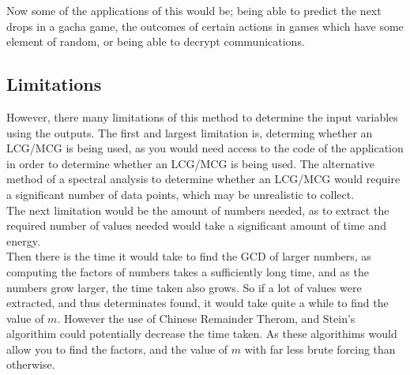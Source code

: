 \documentclass[12pft, english]{article}
\begin{document}
\begin{multicols}{2}
    Now some of the applications of this would be; being able to predict the next drops in a gacha game, the outcomes of certain actions in games which have some element of random, or being able to decrypt communications.

    \subsection{Limitations}
    However, there many limitations of this method to determine the input variables using the outputs. The first and largest limitation is, determing whether an LCG/MCG is being used, as you would need access to the code of the application in order to determine whether an LCG/MCG is being used. The alternative method of a spectral analysis to determine whether an LCG/MCG would require a significant number of data points, which may be unrealistic to collect. \\
    The next limitation would be the amount of numbers needed, as to extract the required number of values needed would take a significant amount of time and energy. \\
    Then there is the time it would take to find the GCD of larger numbers, as computing the factors of numbers takes a sufficiently long time, and as the numbers grow larger, the time taken also grows. So if a lot of values were extracted, and thus determinates found, it would take quite a while to find the value of \(m\). However the use of Chinese Remainder Therom, and Stein's algorithim could potentially decrease the time taken. As these algorithims would allow you to find the factors, and the value of \(m\) with far less brute forcing than otherwise. \\


\end{multicols}
\end{document}
